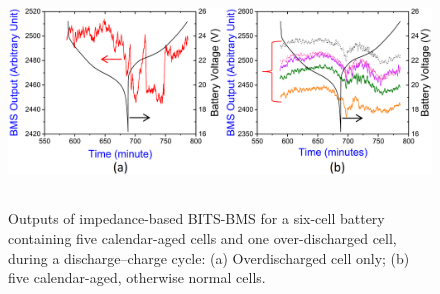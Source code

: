 \begin{figure}
	\includegraphics[width=16cm,height=6cm]{figures/result}
	\centering
	\caption{Outputs of impedance-based BITS-BMS for a six-cell battery containing five calendar-aged cells and one over-discharged cell, during a discharge–charge cycle: (a) Overdischarged cell only; (b) five calendar-aged, otherwise normal cells.} \label{result}
\end{figure}

